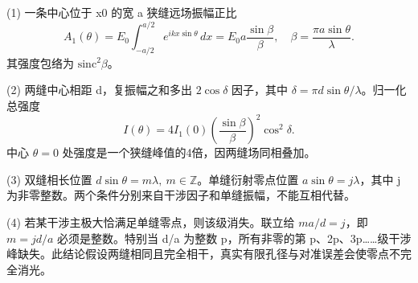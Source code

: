 (1) 一条中心位于 x0 的宽 a 狭缝远场振幅正比
\[
A_1(\theta)=E_0\int_{-a/2}^{a/2}e^{ikx\sin\theta}\,dx
=E_0a\frac{\sin\beta}{\beta},
\quad \beta=\frac{\pi a\sin\theta}{\lambda}.
\]
其强度包络为 \(\mathrm{sinc}^2\beta\)。

(2) 两缝中心相距 d，复振幅之和多出 \(2\cos\delta\) 因子，其中 \(\delta=\pi d\sin\theta/\lambda\)。归一化总强度
\[
I(\theta)=4I_1(0)\left(\frac{\sin\beta}{\beta}\right)^2\cos^2\delta.
\]
中心 \(\theta =0\) 处强度是一个狭缝峰值的4倍，因两缝场同相叠加。

(3) 双缝相长位置 \(d\sin\theta=m\lambda,\ m\in\mathbb Z\)。单缝衍射零点位置 \(a\sin\theta=j\lambda\)，其中 j 为非零整数。两个条件分别来自干涉因子和单缝振幅，不能互相代替。

(4) 若某干涉主极大恰满足单缝零点，则该级消失。联立给 \(m a/d=j\)，即 \(m=j d/a\) 必须是整数。特别当 d/a 为整数 p，所有非零的第 p、2p、3p……级干涉峰缺失。此结论假设两缝相同且完全相干，真实有限孔径与对准误差会使零点不完全消光。
